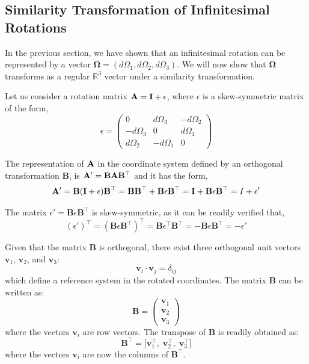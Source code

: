 \documentclass[12pt]{article}
\begin{document}
\subsection{Similarity Transformation of Infinitesimal Rotations}

In the previous section, we have shown that an infinitesimal rotation can be represented by
a vector $\boldsymbol{\Omega} = (d\Omega_1, d\Omega_2, d\Omega_3)$. We will now show that
$\boldsymbol{\Omega}$ transforms as a regular $\mathbb{R}^3$ vector under a similarity
transformation.

Let us consider a rotation matrix $\vb{A} = \vb{I} + \epsilon$, where $\epsilon$ is a
skew-symmetric matrix of the form,
\begin{equation}
  \epsilon =
  \begin{pmatrix}
    0           &  d\Omega_3 & -d\Omega_2 \\
    -d\Omega_3  &  0         &  d\Omega_1 \\
    d\Omega_2   & -d\Omega_1 &  0
  \end{pmatrix}
\end{equation}

The representation of $\vb{A}$ in the coordinate system defined by an orthogonal
transformation $\mathbf{B}$, is $\vb{A}' = \mathbf{B}\vb{A}\mathbf{B}^\top$ and it has the
form,
\begin{equation}
  \vb{A}' = \mathbf{B}(\vb{I}+\epsilon)\mathbf{B}^\top
           = \mathbf{B}\mathbf{B}^\top + \mathbf{B}\epsilon\mathbf{B}^\top
           = \vb{I} + \mathbf{B}\epsilon\mathbf{B}^\top
           = I + \epsilon'
\end{equation}

The matrix $\epsilon' = \mathbf{B}\epsilon\mathbf{B}^\top$ is skew-symmetric, as it can be
readily verified that,
\begin{equation}
  (\epsilon')^\top = (\mathbf{B}\epsilon\mathbf{B}^\top)^\top
                   = \mathbf{B}\epsilon^\top\mathbf{B}^\top
                   = -\mathbf{B}\epsilon\mathbf{B}^\top = -\epsilon'
\end{equation}

Given that the matrix $\mathbf{B}$ is orthogonal, there exist three orthogonal unit vectors
$\mathbf{v}_1$, $\mathbf{v}_2$, and $\mathbf{v}_3$:
\begin{equation}
  \mathbf{v}_i \cdot \mathbf{v}_j = \delta_{ij}
\end{equation}
which define a reference system in the rotated coordinates. The matrix $\mathbf{B}$ can be
written as:
\begin{equation}
  \mathbf{B} =
  \begin{pmatrix} \mathbf{v}_1 \\ \mathbf{v}_2 \\ \mathbf{v}_3 \end{pmatrix}
\end{equation}
where the vectors $\mathbf{v}_i$ are row vectors. The transpose of $\mathbf{B}$ is readily
obtained as:
\begin{equation}
  \mathbf{B}^\top = \bigl[\mathbf{v}_1^\top,\; \mathbf{v}_2^\top,\; \mathbf{v}_3^\top\bigr]
\end{equation}
where the vectors $\mathbf{v}_i$ are now the columns of $\mathbf{B}^\top$.
\end{document}
